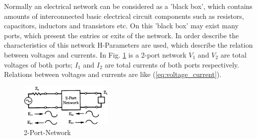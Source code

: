 Normally an electrical network can be considered as a 'black box', which contains amounts of interconnected basic electrical circuit components such as resistors, capacitors, inductors and transistors etc. On this 'black box' may exist many ports, which present the entries or exits of the network. In order describe the characteristics of this network H-Parameters are used, which describe the relation between voltages and currents. In Fig. \ref{fig:2_port_network} is a 2-port network $V_{1}$ and $V_{2}$ are total voltages of both ports; $I_{1}$ and $I_{2}$ are total currents of both ports respectively. Relations between voltages and currents are like (\ref{eq:voltage_current}). 
\begin{figure}[!ht]
\centering
\includegraphics[width=0.4\textwidth]{bilder/s_parameters}
\caption{2-Port-Network \cite{aglient_s_parameters}}
\label{fig:2_port_network}
\end{figure}

